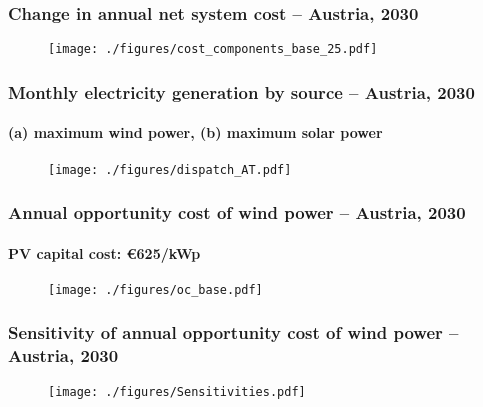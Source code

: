 \documentclass[aspectratio=1610, xcolor=dvipsnames]{beamer}
\begin{document}
    \begin{frame}
        \frametitle{Change in annual net system cost -- Austria, 2030}
        \begin{figure}
            \texttt{[image: ./figures/cost\_components\_base\_25.pdf]} \label{fig:cost_breakdown}
        \end{figure}
    \end{frame}

    \begin{frame}
        \frametitle{Monthly electricity generation by source -- Austria, 2030}
        \framesubtitle{(a) maximum wind power, (b) maximum solar power}
        \begin{figure}
            \texttt{[image: ./figures/dispatch\_AT.pdf]} \label{fig:monthly_gen}
        \end{figure}
    \end{frame}

    \begin{frame}
        \frametitle{Annual opportunity cost of wind power -- Austria, 2030}
        \framesubtitle{PV capital cost: \euro 625/kWp}
        \begin{figure}
            \texttt{[image: ./figures/oc\_base.pdf]} \label{fig:opportunity_cost_base}
        \end{figure}
    \end{frame}

    \begin{frame}
        \frametitle{Sensitivity of annual opportunity cost of wind power -- Austria, 2030}
        \begin{figure}
            \texttt{[image: ./figures/Sensitivities.pdf]} \label{fig:sensitivities}
        \end{figure}
    \end{frame}
\end{document}
